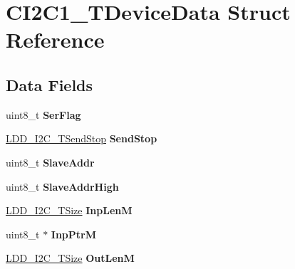 \hypertarget{struct_c_i2_c1___t_device_data}{\section{C\-I2\-C1\-\_\-\-T\-Device\-Data Struct Reference}
\label{struct_c_i2_c1___t_device_data}
}
\subsection*{Data Fields}
\begin{DoxyCompactItemize}
\item 
\hypertarget{struct_c_i2_c1___t_device_data_a3dc3a36fb1651e1afce4266347ff301e}{uint8\-\_\-t {\bfseries Ser\-Flag}}\label{struct_c_i2_c1___t_device_data_a3dc3a36fb1651e1afce4266347ff301e}

\item 
\hypertarget{struct_c_i2_c1___t_device_data_a414fc2eb730508862705f7c5c3e95080}{\hyperlink{group___p_e___types__module_gacac4ade6fbcd28c9ddcd864242063ec8}{L\-D\-D\-\_\-\-I2\-C\-\_\-\-T\-Send\-Stop} {\bfseries Send\-Stop}}\label{struct_c_i2_c1___t_device_data_a414fc2eb730508862705f7c5c3e95080}

\item 
\hypertarget{struct_c_i2_c1___t_device_data_ac28b250efcc00843c7db171a42a4dbf3}{uint8\-\_\-t {\bfseries Slave\-Addr}}\label{struct_c_i2_c1___t_device_data_ac28b250efcc00843c7db171a42a4dbf3}

\item 
\hypertarget{struct_c_i2_c1___t_device_data_aa8a440cce745a59e8d4bf1380ced8bf6}{uint8\-\_\-t {\bfseries Slave\-Addr\-High}}\label{struct_c_i2_c1___t_device_data_aa8a440cce745a59e8d4bf1380ced8bf6}

\item 
\hypertarget{struct_c_i2_c1___t_device_data_a6d53388c21c932634f4d0c352939c7a1}{\hyperlink{group___p_e___types__module_gaa7fd2bc3f1f93e051058f9e70349c2b9}{L\-D\-D\-\_\-\-I2\-C\-\_\-\-T\-Size} {\bfseries Inp\-Len\-M}}\label{struct_c_i2_c1___t_device_data_a6d53388c21c932634f4d0c352939c7a1}

\item 
\hypertarget{struct_c_i2_c1___t_device_data_af273e1c193e6ab64c94aeecf297330d1}{uint8\-\_\-t $\ast$ {\bfseries Inp\-Ptr\-M}}\label{struct_c_i2_c1___t_device_data_af273e1c193e6ab64c94aeecf297330d1}

\item 
\hypertarget{struct_c_i2_c1___t_device_data_acc60e17a1f11249d976760a99894c92c}{\hyperlink{group___p_e___types__module_gaa7fd2bc3f1f93e051058f9e70349c2b9}{L\-D\-D\-\_\-\-I2\-C\-\_\-\-T\-Size} {\bfseries Out\-Len\-M}}\label{struct_c_i2_c1___t_device_data_acc60e17a1f11249d976760a99894c92c}


\end{DoxyCompactItemize}
